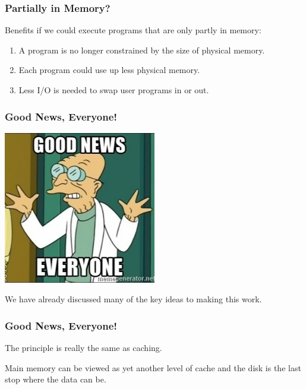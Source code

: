 \begin{frame}
\frametitle{Partially in Memory?}

Benefits if we could execute programs that are only partly in memory:

\begin{enumerate}
	\item A program is no longer constrained by the size of physical memory.
	\item Each program could use up less physical memory.
	\item Less I/O is needed to swap user programs in or out.
\end{enumerate}

\end{frame}

\begin{frame}
\frametitle{Good News, Everyone!}

\begin{center}
	\includegraphics[width=0.5\textwidth]{images/goodnews.jpg}
\end{center}

We have already discussed many of the key ideas to making this work. 

\end{frame}

\begin{frame}
\frametitle{Good News, Everyone!}

The principle is really the same as caching. 

Main memory can be viewed as yet another level of cache and the disk is the last stop where the data can be. 


\end{frame}

